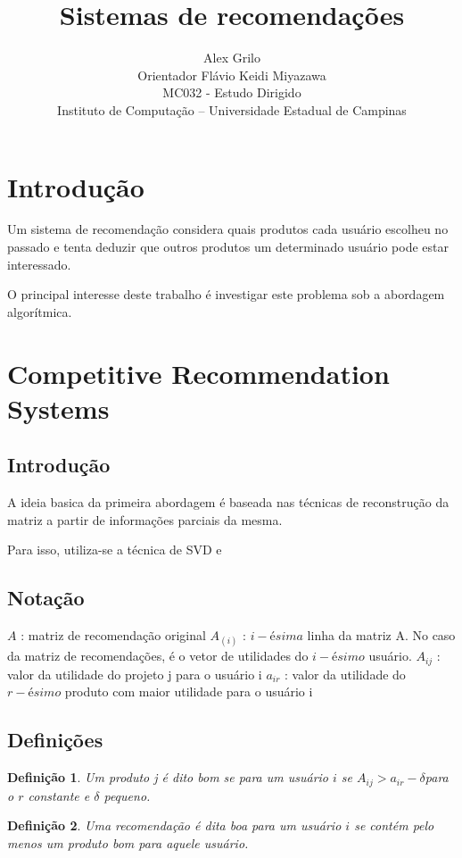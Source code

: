 \documentclass[a4paper,10pt]{article}
\title{Sistemas de recomendações}
\author{Alex Grilo \\ Orientador Flávio Keidi Miyazawa\\ MC032 - Estudo Dirigido \\ \normalsize{Instituto de Computação -- Universidade Estadual de Campinas}}
\begin{document}
\maketitle

\newtheorem{definicao}{Definição}
\newtheorem{lema}{Lema}
\newtheorem{coro}{Corolário}


\section{Introdução}

Um sistema de recomendação considera quais produtos cada usuário
escolheu no passado e tenta deduzir que outros produtos um determinado
usuário pode estar interessado. 

O principal interesse deste trabalho é investigar este problema sob a
abordagem algorítmica.

\section{Competitive Recommendation Systems}


\subsection{Introdução}
A ideia basica da primeira abordagem é baseada nas técnicas de 
reconstru\c{c}\~ao da matriz a partir de informa\c{c}\~oes parciais
da mesma. 

Para isso, utiliza-se a técnica de SVD e 

\subsection{Notação}

$A$ : matriz de recomendação original
$A_(i)$ : $i-ésima$ linha da matriz A. No caso da matriz de recomendações, é o vetor de utilidades do $i-ésimo$ usuário.
$A_{ij}$ : valor da utilidade do projeto j para o usuário i
$a_{ir}$ : valor da utilidade do $r-ésimo$ produto com maior utilidade para o usuário i 

\subsection{Definições}


\begin{definicao} \label{definicao:box} Um produto j é dito bom se para um usuário $i$ se $A_{ij} > a_{ir} - \delta$para o $r$ constante e $\delta$ pequeno.
\end{definicao}
\begin{definicao} \label{definicao:box}Uma recomendação é dita boa para um usuário $i$ se contém pelo menos um produto bom para aquele usuário.
\end{definicao}
\end{document}
